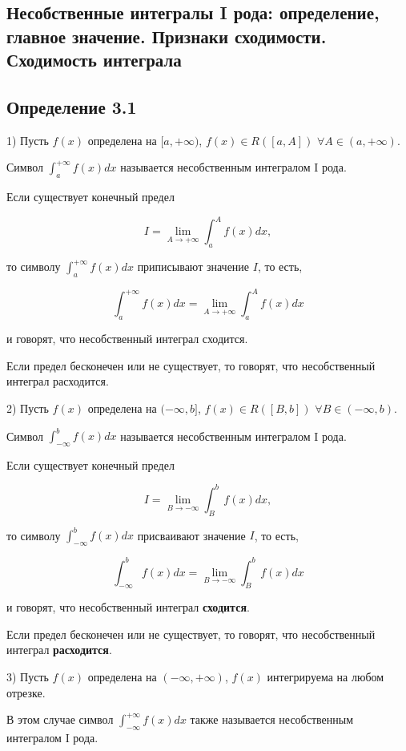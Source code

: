 {
\subsection{Несобственные интегралы I рода: определение, главное значение. Признаки сходимости. Сходимость интеграла}

\subsection*{Определение 3.1}

1) Пусть \( f(x) \) определена на \( [a, +\infty) \), \( f(x) \in R([a, A]) \) \( \forall A \in (a, +\infty) \).

Символ \( \int_{a}^{+\infty} f(x)dx \) называется несобственным интегралом I рода.

Если существует конечный предел 

\[
I = \lim_{A \to +\infty} \int_{a}^{A} f(x)dx,
\]

то символу \( \int_{a}^{+\infty} f(x)dx \) приписывают значение \( I \), то есть,

\[
\int_{a}^{+\infty} f(x)dx = \lim_{A \to +\infty} \int_{a}^{A} f(x)dx
\]

и говорят, что несобственный интеграл сходится.

Если предел бесконечен или не существует, то говорят, что несобственный интеграл расходится.

2) Пусть \( f(x) \) определена на \( (-\infty, b] \), \( f(x) \in R([B, b]) \) \( \forall B \in (-\infty, b) \).

Символ \( \int_{-\infty}^{b} f(x)dx \) называется несобственным интегралом I рода.

Если существует конечный предел 

\[
I = \lim_{B \to -\infty} \int_{B}^{b} f(x)dx,
\]

то символу \( \int_{-\infty}^{b} f(x)dx \) присваивают значение \( I \), то есть,

\[
\int_{-\infty}^{b} f(x)dx = \lim_{B \to -\infty} \int_{B}^{b} f(x)dx
\]

и говорят, что несобственный интеграл \textbf{сходится}.

Если предел бесконечен или не существует, то говорят, что несобственный интеграл \textbf{расходится}.

3) Пусть \( f(x) \) определена на \( (-\infty, +\infty) \), \( f(x) \) интегрируема на любом отрезке.

В этом случае символ \( \int_{-\infty}^{+\infty} f(x)dx \) также называется несобственным интегралом I рода.

}
